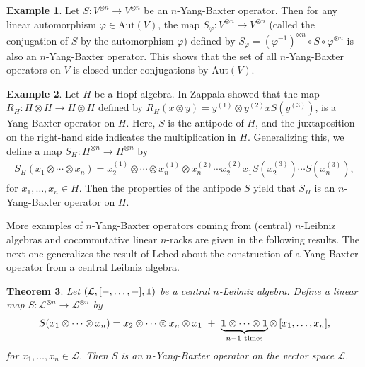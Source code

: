 \documentclass[a4paper,reqno,10pt]{amsart}
\theoremstyle{plain}
\newtheorem{thm}{Theorem}[section]
\theoremstyle{definition}
\newtheorem{exam}[thm]{Example}
\theoremstyle{remark}
\begin{document}
\begin{exam}
    Let $S : V^{\otimes n} \rightarrow V^{\otimes n}$ be an $n$-Yang-Baxter operator. Then for any linear automorphism $\varphi \in \mathrm{Aut} (V)$, the map $S_\varphi : V^{\otimes n} \rightarrow V^{\otimes n}$ (called the conjugation of $S$ by the automorphism $\varphi$) defined by $S_\varphi = (\varphi^{-1})^{\otimes n} \circ S \circ \varphi^{\otimes n}$ is also an $n$-Yang-Baxter operator. This shows that the set of all $n$-Yang-Baxter operators on $V$ is closed under conjugations by $\mathrm{Aut}(V)$.
\end{exam}

\begin{exam}
    Let $H$ be a Hopf algebra. In \cite{zappala} Zappala showed that the map $R_H : H \otimes H \rightarrow H \otimes H$ defined by $R_H (x \otimes y) = y^{(1)} \otimes y^{(2)} x S(y^{(3)})$, is a Yang-Baxter operator on $H$. Here, $S$ is the antipode of $H$, and the juxtaposition on the right-hand side indicates the multiplication in $H$. Generalizing this, we define a map $S_H : H^{\otimes n} \rightarrow H^{\otimes n}$ by
    \begin{align*}
        S_H (x_1 \otimes \cdots \otimes x_n) = x_2^{(1)} \otimes \cdots \otimes x_n^{(1)} \otimes x_n^{(2)} \cdots x_2^{(2)} x_1 S(x_2^{(3)}) \cdots S(x_n^{(3)}),
    \end{align*}
    for $x_1, \ldots, x_n \in H$. Then the properties of the antipode $S$ yield that $S_H$ is an $n$-Yang-Baxter operator on $H$.
\end{exam}

More examples of $n$-Yang-Baxter operators coming from (central) $n$-Leibniz algebras and cocommutative linear $n$-racks are given in the following results. The next one generalizes the result of Lebed \cite{lebed2} about the construction of a Yang-Baxter operator from a central Leibniz algebra.

\begin{thm}\label{central-n-leibniz-nyb}
    Let $(\mathcal{L}, [-, \ldots, -], {\bf 1})$ be a central $n$-Leibniz algebra. Define a linear map $S : \mathcal{L}^{\otimes n} \rightarrow \mathcal{L}^{\otimes n}$ by
    \begin{align*}
        S (x_1 \otimes \cdots \otimes x_n) = x_2 \otimes \cdots \otimes x_n \otimes x_1 ~+~ \underbrace{{\bf 1} \otimes \cdots \otimes {\bf 1} }_{n-1 \mathrm{~ times}}\otimes ~ \! [x_1, \ldots, x_n],
    \end{align*}
    for $x_1, \ldots, x_n \in \mathcal{L}$. Then $S$ is an $n$-Yang-Baxter operator on the vector space $\mathcal{L}$.
\end{thm}
\end{document}
